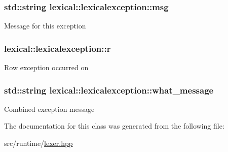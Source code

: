 \subsubsection[{\texorpdfstring{msg}{msg}}]{\setlength{\rightskip}{0pt plus 5cm}std\+::string lexical\+::lexicalexception\+::msg}\hypertarget{classlexical_1_1lexicalexception_aca4560509cfad8e43c42def571bba550}{}\label{classlexical_1_1lexicalexception_aca4560509cfad8e43c42def571bba550}
Message for this exception 
\subsubsection[{\texorpdfstring{r}{r}}]{ lexical\+::lexicalexception\+::r}\hypertarget{classlexical_1_1lexicalexception_a785417c9f8375670d73567db6562b74a}{}\label{classlexical_1_1lexicalexception_a785417c9f8375670d73567db6562b74a}
Row exception occurred on 
\subsubsection[{\texorpdfstring{what\+\_\+message}{what_message}}]{\setlength{\rightskip}{0pt plus 5cm}std\+::string lexical\+::lexicalexception\+::what\+\_\+message\hspace{0.3cm}{\ttfamily [private]}}\hypertarget{classlexical_1_1lexicalexception_ad116c229b30998b6630210dd86e8b10f}{}\label{classlexical_1_1lexicalexception_ad116c229b30998b6630210dd86e8b10f}
Combined exception message 

The documentation for this class was generated from the following file\+:\begin{DoxyCompactItemize}
\item 
src/runtime/\hyperlink{lexer_8hpp}{lexer.\+hpp}\end{DoxyCompactItemize}
